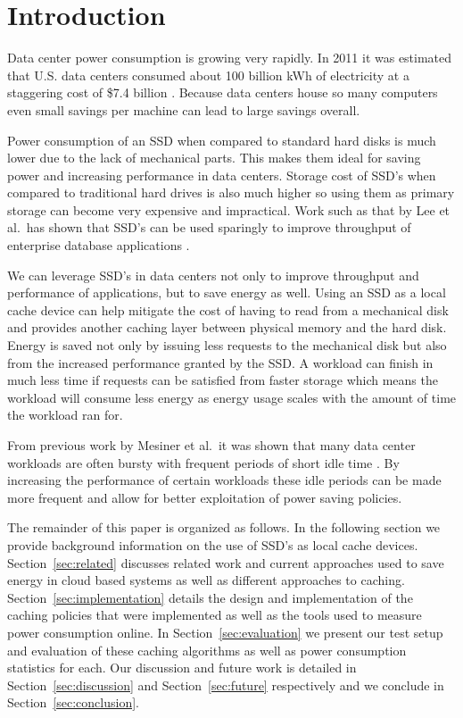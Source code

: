 \section{Introduction}

Data center power consumption is growing very rapidly. In 2011 it was estimated
that U.S. data centers consumed about 100 billion kWh of electricity at a
staggering cost of \$7.4 billion \cite{data-center-power}. Because data centers
house so many computers even small savings per machine can lead to large
savings overall.

Power consumption of an SSD when compared to standard hard disks is much lower
due to the lack of mechanical parts. This makes them ideal for saving power and
increasing performance in data centers. Storage cost of SSD's when compared to
traditional hard drives is also much higher so using them as primary storage can
become very expensive and impractical. Work such as that by Lee et al.\ has
shown that SSD's can be used sparingly to improve throughput of enterprise
database applications \cite{enterprise-ssd}.

We can leverage SSD's in data centers not only to improve throughput and
performance of applications, but to save energy as well. Using an SSD as a local
cache device can help mitigate the cost of having to read from a mechanical disk
and provides another caching layer between physical memory and the hard
disk. Energy is saved not only by issuing less requests to the mechanical disk
but also from the increased performance granted by the SSD. A workload can
finish in much less time if requests can be satisfied from faster storage which
means the workload will consume less energy as energy usage scales with the
amount of time the workload ran for.

From previous work by Mesiner et al.\ it was shown that many data center
workloads are often bursty with frequent periods of short idle time
\cite{powernap}. By increasing the performance of certain workloads these idle
periods can be made more frequent and allow for better exploitation of power
saving policies.

The remainder of this paper is organized as follows. In the following section we
provide background information on the use of SSD's as local cache
devices. Section~\ref{sec:related} discusses related work and current approaches
used to save energy in cloud based systems as well as different approaches to
caching. Section~\ref{sec:implementation} details the design and implementation
of the caching policies that were implemented as well as the tools used to
measure power consumption online. In Section~\ref{sec:evaluation} we present our
test setup and evaluation of these caching algorithms as well as power
consumption statistics for each. Our discussion and future work is detailed in
Section~\ref{sec:discussion} and Section~\ref{sec:future} respectively and we
conclude in Section~\ref{sec:conclusion}.
